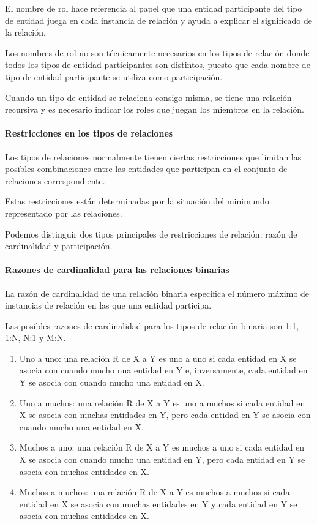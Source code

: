 El nombre de rol hace referencia al papel que una entidad participante del tipo de entidad juega en cada instancia de relación y ayuda a explicar el significado de la relación.


Los nombres de rol no son técnicamente necesarios en los tipos de relación donde todos los tipos de entidad participantes son distintos, puesto que cada nombre de tipo de entidad participante se utiliza como participación.

Cuando un tipo de entidad se relaciona consigo misma, se tiene una relación recursiva y es necesario indicar los roles que juegan los miembros en la relación.


\paragraph*{Restricciones en los tipos de relaciones}


Los tipos de relaciones normalmente tienen ciertas restricciones que limitan las posibles combinaciones entre las entidades que participan en el conjunto de relaciones correspondiente.


Estas restricciones están determinadas por la situación del minimundo representado por las relaciones. 


Podemos distinguir dos tipos principales de restricciones de relación: razón de cardinalidad y participación.


\paragraph*{Razones de cardinalidad para las relaciones binarias}
La razón de cardinalidad de una relación binaria especifica el número máximo de instancias de relación en las que una entidad participa.


Las posibles razones de cardinalidad para los tipos de relación binaria son 1:1, 1:N, N:1 y M:N.
\begin{enumerate}
    \item Uno a uno: una relación R de X a Y es uno a uno si cada entidad en X se asocia con cuando mucho una entidad en Y e, inversamente, cada entidad en Y se asocia con cuando mucho una entidad en X.
    \item Uno a muchos: una relación R de X a Y es uno a muchos si cada entidad en X se asocia con muchas entidades en Y, pero cada entidad en Y se asocia con cuando mucho una entidad en X. 
    \item Muchos a uno: una relación R de X a Y es muchos a uno si cada entidad en X se asocia con cuando mucho una entidad en Y, pero cada entidad en Y se asocia con muchas entidades en X. 
    \item Muchos a muchos: una relación R de X a Y es muchos a muchos si cada entidad en X se asocia con muchas entidades en Y y cada entidad en Y se asocia con muchas entidades en X. 
\end{enumerate}

